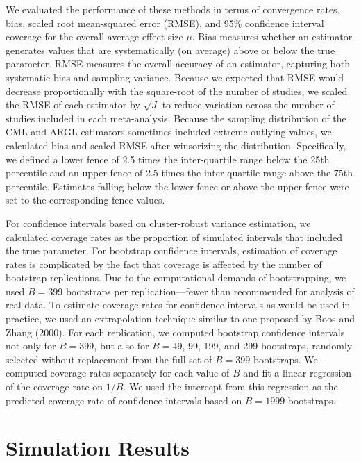 \documentclass[
  american,
  man, donotrepeattitle,floatsintext]{apa7}
\begin{document}
We evaluated the performance of these methods in terms of convergence rates, bias,
scaled root mean-squared error (RMSE), and 95\% confidence interval coverage for the overall average effect size \(\mu\).
Bias measures whether an estimator generates values that are systematically (on average) above or below
the true parameter.
RMSE measures the overall accuracy of an estimator, capturing both systematic bias and sampling variance.
Because we expected that RMSE would decrease proportionally with the square-root of the number of studies, we scaled the RMSE of each estimator by \(\sqrt{J}\) to reduce variation across the number of studies included in each meta-analysis.
Because the sampling distribution of the CML and ARGL estimators sometimes included extreme outlying values, we calculated bias and scaled RMSE after winsorizing the distribution.
Specifically, we defined a lower fence of 2.5 times the inter-quartile range below the 25th percentile and an upper fence of 2.5 times the inter-quartile range above the 75th percentile.
Estimates falling below the lower fence or above the upper fence were set to the corresponding fence values.

For confidence intervals based on cluster-robust variance estimation, we calculated coverage rates as the proportion of simulated intervals that included the true parameter.
For bootstrap confidence intervals, estimation of coverage rates is complicated by the fact that coverage is affected by the number of bootstrap replications.
Due to the computational demands of bootstrapping, we used \(B = 399\) bootstraps per replication---fewer than recommended for analysis of real data.
To estimate coverage rates for confidence intervals as would be used in practice, we used an extrapolation technique similar to one proposed by Boos and Zhang (2000).
For each replication, we computed bootstrap confidence intervals not only for \(B = 399\), but also for \(B = 49\), 99, 199, and 299 bootstraps, randomly selected without replacement from the full set of \(B = 399\) bootstraps.
We computed coverage rates separately for each value of \(B\) and fit a linear regression of the coverage rate on \(1 / B\).
We used the intercept from this regression as the predicted coverage rate of confidence intervals based on \(B = 1999\) bootstraps.

\section{Simulation Results}\label{simulation-results}
\end{document}

